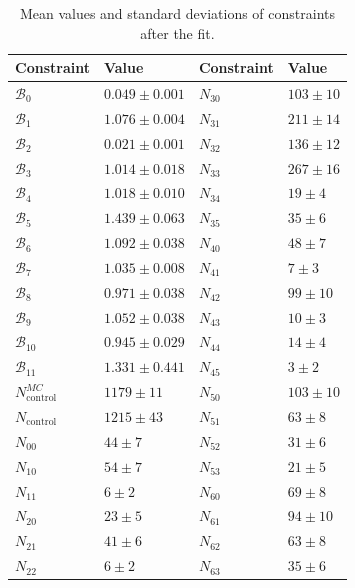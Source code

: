 \begin{table}[H]
	\centering
	\begin{tabular}{l|l||l|l}
		Constraint & Value & Constraint & Value \\
		\toprule
		$\mathcal{B}_{0}$ & $0.049 \pm 0.001$ & $N_{30}$ & $103 \pm 10$\\
		$\mathcal{B}_{1}$ & $1.076 \pm 0.004$ & $N_{31}$ & $211 \pm 14$\\
		$\mathcal{B}_{2}$ & $0.021 \pm 0.001$ & $N_{32}$ & $136 \pm 12$\\
		$\mathcal{B}_{3}$ & $1.014 \pm 0.018$ & $N_{33}$ & $267 \pm 16$\\
		$\mathcal{B}_{4}$ & $1.018 \pm 0.010$ & $N_{34}$ & $19 \pm 4$\\
		$\mathcal{B}_{5}$ & $1.439 \pm 0.063$ & $N_{35}$ & $35 \pm 6$\\
		$\mathcal{B}_{6}$ & $1.092 \pm 0.038$ & $N_{40}$ & $48 \pm 7$\\
		$\mathcal{B}_{7}$ & $1.035 \pm 0.008$ & $N_{41}$ & $7 \pm 3$\\
		$\mathcal{B}_{8}$ & $0.971 \pm 0.038$ & $N_{42}$ & $99 \pm 10$\\
		$\mathcal{B}_{9}$ & $1.052 \pm 0.038$ & $N_{43}$ & $10 \pm 3$\\
		$\mathcal{B}_{10}$ & $0.945 \pm 0.029$ & $N_{44}$ & $14 \pm 4$\\
		$\mathcal{B}_{11}$ & $1.331 \pm 0.441$ & $N_{45}$ & $3 \pm 2$\\
		$N_{\mathrm{control}}^{MC}$ & $1179 \pm 11$ & $N_{50}$ & $103 \pm 10$\\
		$N_{\mathrm{control}}$ & $1215 \pm 43$ & $N_{51}$ & $63 \pm 8$\\
		$N_{00}$ & $44 \pm 7$ & $N_{52}$ & $31 \pm 6$\\
		$N_{10}$ & $54 \pm 7$ & $N_{53}$ & $21 \pm 5$\\
		$N_{11}$ & $6 \pm 2$ & $N_{60}$ & $69 \pm 8$\\
		$N_{20}$ & $23 \pm 5$ & $N_{61}$ & $94 \pm 10$\\
		$N_{21}$ & $41 \pm 6$ & $N_{62}$ & $63 \pm 8$\\
		$N_{22}$ & $6 \pm 2$ & $N_{63}$ & $35 \pm 6$\\
		\bottomrule
	\end{tabular}
	\captionsetup{width=.8\linewidth}
	\caption{Mean values and standard deviations of constraints after the fit.}
	\label{tab:constraints}
\end{table}

